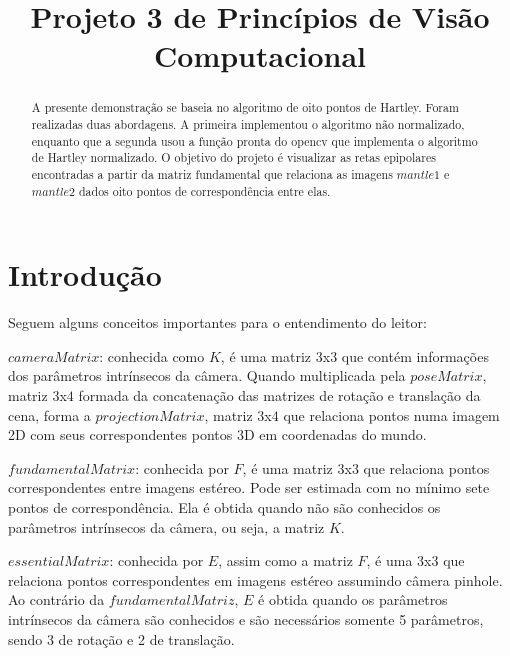 \documentclass[conference]{IEEEtran}
\begin{document}
\title{Projeto 3 de Princ\'ipios de Vis\~ao Computacional}
\author{
}
\maketitle
\begin{abstract}
A presente demonstra\c{c}\~ao se baseia no algoritmo de oito pontos de Hartley. Foram realizadas duas abordagens. A primeira implementou
o algoritmo n\~ao normalizado, enquanto que a segunda usou a fun\c{c}\~ao pronta do opencv que implementa o algoritmo de Hartley
normalizado. O objetivo do projeto \'e visualizar as retas epipolares encontradas a partir da matriz fundamental que relaciona 
as imagens $mantle1$ e $mantle2$ dados oito pontos de correspond\^encia entre elas.
\end{abstract}

\section{ Introdu\c{c}\~ao} 
\label{sec:meth} 
	Seguem alguns conceitos importantes para o entendimento do leitor:
	
	$cameraMatrix$: conhecida como $K$, \'e uma matriz $3$x$3$ que cont\'em informa\c{c}\~oes dos par\^ametros intr\'insecos
	da c\^amera. Quando multiplicada pela $poseMatrix$, matriz $3$x$4$ formada da concatena\c{c}\~ao das matrizes de rota\c{c}\~ao
	 e transla\c{c}\~ao da cena, forma a $projectionMatrix$, matriz $3$x$4$ que relaciona pontos numa imagem 2D com seus correspondentes
	 pontos 3D em coordenadas do mundo.
	 
	$fundamentalMatrix$: conhecida por $F$, \'e uma matriz $3$x$3$ que relaciona pontos correspondentes entre imagens
	est\'ereo. Pode ser estimada com no m\'inimo sete pontos de correspond\^encia. Ela \'e obtida quando n\~ao s\~ao 
	conhecidos os par\^ametros intr\'insecos da c\^amera, ou seja, a matriz $K$.
	
	$essentialMatrix$: conhecida por $E$, assim como a matriz $F$, \'e uma $3$x$3$ que relaciona pontos correspondentes
	em imagens est\'ereo assumindo c\^amera pinhole. Ao contr\'ario da $fundamentalMatriz$, $E$ \'e obtida quando os 
	par\^ametros intr\'insecos da c\^amera s\~ao conhecidos e s\~ao necess\'arios somente 5 par\^ametros, sendo 3
	de rota\c{c}\~ao e 2 de transla\c{c}\~ao.
	
\end{document}
